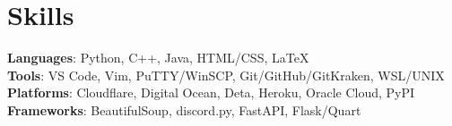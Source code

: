 \documentclass[letterpaper,11pt]{article}
\begin{document}
\section{Skills}
\begin{itemize}[leftmargin=0.15in, label={}]
	\small{\item{
		            \textbf{Languages}{: Python, C++, Java, HTML/CSS, \LaTeX} \\
		            \textbf{Tools}{: VS Code, Vim, PuTTY/WinSCP, Git/GitHub/GitKraken, WSL/UNIX} \\
		            \textbf{Platforms}{: Cloudflare, Digital Ocean, Deta, Heroku, Oracle Cloud, PyPI} \\
		            \textbf{Frameworks}{: BeautifulSoup, discord.py, FastAPI, Flask/Quart} \\
		      }}
\end{itemize}
\end{document}
